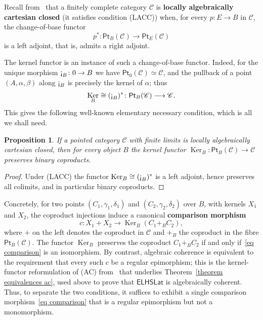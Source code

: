\documentclass[reqno,a4paper]{amsart}
\newtheorem{proposition}[lemma]{Proposition}
\theoremstyle{remark}
\theoremstyle{definition}
\newcommand{\defn}{\textbf}
\newcommand{\LACC}{{\rm (LACC)}}
\newcommand{\AC}{{\rm (AC)}}
\newcommand{\gnab}{\text{\rm \textexclamdown}} %
\DeclareMathOperator{\Ker}{Ker}
\newcommand{\ELHSLat}{\ensuremath{\mathsf{ELHSLat}}}
\newcommand{\C}{\ensuremath{\mathcal{C}}}
\newcommand{\Pt}{\ensuremath{\mathsf{Pt}}}
\begin{document}
Recall from~\cite{Bourn-Gray} that a finitely complete category \(\C\) is \defn{locally algebraically cartesian closed} (it satisfies condition \LACC{}) when, for every \({p\colon E \to B}\) in \(\C\), the change-of-base functor
\[
	p^* \colon \Pt_B(\C) \longrightarrow \Pt_E(\C)
\]
is a left adjoint, that is, admits a right adjoint.

The kernel functor is an instance of such a change-of-base functor. Indeed, for the unique morphism \(\gnab_B \colon 0 \to B\) we have \(\Pt_0(\C) \simeq \C\), and the pullback of a point \((A,\alpha,\beta)\) along \(\gnab_B\) is precisely the kernel of \(\alpha\); thus
\[
	\Ker_B \cong (\gnab_B)^* \colon \Pt_B(\C) \longrightarrow \C.
\]
This gives the following well-known elementary necessary condition, which is all we shall need.

\begin{proposition}\label{proposition lacc preserves coproducts}
	If a pointed category \(\C\) with finite limits is locally algebraically cartesian closed, then for every object \(B\) the kernel functor \(\Ker_B \colon \Pt_B(\C) \to \C\) preserves binary coproducts.
\end{proposition}
\begin{proof}
	Under \LACC{} the functor \(\Ker_B \cong (\gnab_B)^*\) is a left adjoint, hence preserves all colimits, and in particular binary coproducts.
\end{proof}

Concretely, for two points \((C_1,\gamma_1,\delta_1)\) and \((C_2,\gamma_2,\delta_2)\) over \(B\), with kernels \(X_1\) and \(X_2\), the coproduct injections induce a canonical \defn{comparison morphism}
\begin{equation}\label{eq comparison}
	c \colon X_1 + X_2 \longrightarrow \Ker_B(C_1 +_B C_2),
\end{equation}
where \(+\) on the left denotes the coproduct in \(\C\) and \(+_B\) the coproduct in the fibre \(\Pt_B(\C)\). The functor \(\Ker_B\) preserves the coproduct \(C_1 +_B C_2\) if and only if~\eqref{eq comparison} is an isomorphism. By contrast, algebraic coherence is equivalent to the requirement that every such \(c\) be a regular epimorphism; this is the kernel-functor reformulation of \AC{} from~\cite{acc} that underlies Theorem~\ref{theorem equivalences ac}, used above to prove that \(\ELHSLat\) is algebraically coherent. Thus, to separate the two conditions, it suffices to exhibit a single comparison morphism~\eqref{eq comparison} that is a regular epimorphism but not a monomorphism.
\end{document}
